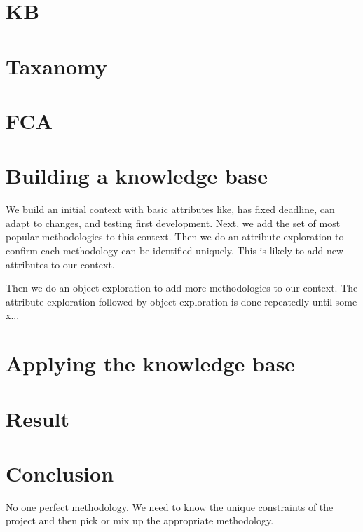 \section{KB}
\section{Taxanomy}
\section{FCA}

\section{Building a knowledge base}
We build an initial context with basic attributes like, has fixed deadline, can adapt to changes, and testing first development.
Next, we add the set of most popular methodologies to this context.
Then we do an attribute exploration to confirm each methodology can be identified uniquely.
This is likely to add new attributes to our context.

Then we do an object exploration to add more methodologies to our context.
The attribute exploration followed by object exploration is done repeatedly until some x...

\section{Applying the knowledge base}

\section{Result}
\section{Conclusion}
No one perfect methodology.
We need to know the unique constraints of the project and then pick or mix up the appropriate methodology.
